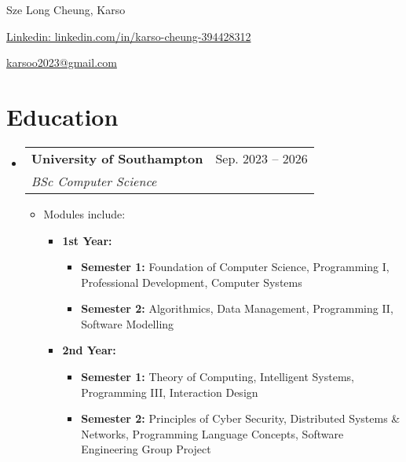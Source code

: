 \documentclass[letterpaper,10pt]{article}
\makeatletter
\newcommand{\resumeSubheading}[4]{
  \vspace{-2pt}\item
    \begin{tabular*}{0.97\textwidth}[t]{l@{\extracolsep{\fill}}r}
      \textbf{#1} & #2 \\
      \textit{\small#3} & \textit{\small #4} \\
    \end{tabular*}\vspace{-7pt}
}
\newcommand{\resumeSubHeadingListStart}{\begin{itemize}[leftmargin=0.15in, label={}]}
\newcommand{\resumeSubHeadingListEnd}{\end{itemize}}
\makeatother
\begin{document}
\begin{center}
    {\LARGE Sze Long Cheung, Karso} \\ \vspace{2pt}
    \begin{multicols}{2}
    \begin{flushleft}
    \href{linkedin.com/in/karso-cheung-394428312}{Linkedin: linkedin.com/in/karso-cheung-394428312}
    \end{flushleft}

    \begin{flushleft}
    \href{}{}
    \end{flushleft}
    
    \begin{flushright}
    \href{mailto:karsoo2023@gmail.com}{karsoo2023@gmail.com}
    \end{flushright}
    \end{multicols}
\end{center}

\vspace{-2pt}
\section{Education}
  \resumeSubHeadingListStart
    \resumeSubheading
      {University of Southampton}{Sep. 2023 -- 2026}
      {BSc Computer Science}{}
      \vspace{-5pt}
      \begin{itemize}[leftmargin=*, label={}]
      \vspace{5pt}
        \item Modules include:
          \begin{itemize}[leftmargin=*, label={}]
            \item \textbf{1st Year:}
              \begin{itemize}[leftmargin=*, label={}]
                \item \textbf{Semester 1:} Foundation of Computer Science, Programming I, Professional Development, Computer Systems
                \item \textbf{Semester 2:} Algorithmics, Data Management, Programming II, Software Modelling
              \end{itemize}
            \item \textbf{2nd Year:}
              \begin{itemize}[leftmargin=*, label={}]
                \item \textbf{Semester 1:} Theory of Computing, Intelligent Systems, Programming III, Interaction Design
                \item \textbf{Semester 2:} Principles of Cyber Security, Distributed Systems \& Networks, Programming Language Concepts, Software Engineering Group Project
              \end{itemize}
          \end{itemize}
      \end{itemize}
  \resumeSubHeadingListEnd
\end{document}
